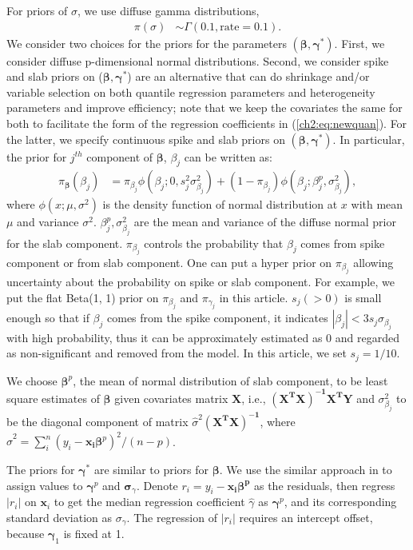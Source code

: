 \documentclass[12pt]{article}
\begin{document}
For priors of $\sigma$, we use diffuse gamma distributions,
\begin{align*}
  \pi(\sigma) & \sim \Gamma(0.1, \mbox{rate} = 0.1).
\end{align*}
We consider two choices for the priors for the parameters
$(\bm{\beta}, \bm{\gamma}^{*})$.  First, we consider diffuse p-dimensional
normal distributions.  Second, we consider spike and slab priors on
($\bm \beta, \bm \gamma^{*}$) are an alternative that can do shrinkage
and/or variable selection on both quantile regression parameters and
heterogeneity parameters and improve efficiency; note that we keep the
covariates the same for both to facilitate the form of the regression
coefficients in (\ref{ch2:eq:newquan}).  For the latter, we specify
continuous spike and slab priors \citep{george1993}
on $(\bm \beta, \bm \gamma^{*})$.
In particular, the prior for $j^{th}$ component of $\bm \beta$, $\beta_j$ can be written as:
\begin{align*}
  \pi_{\bm \beta} (\beta_j) &= \pi_{\beta_j} \phi(\beta_j; 0, s_j^2 \sigma_{\beta_j}^2) + (1- \pi_{\beta_j}) \phi(\beta_j; \beta_j^p, \sigma_{\beta_j}^2),
\end{align*}
where $\phi(x; \mu, \sigma^2)$ is the density function of normal distribution at $x$ with mean $\mu$ and variance $\sigma^2$.
$\beta_j^p, \sigma_{\beta_j}^2$ are the mean and variance of the diffuse normal prior for the slab component.
$\pi_{\beta_j}$ controls the probability that $\beta_j$ comes from spike component or from slab component.
One can put a hyper prior on $\pi_{\beta_j}$ allowing uncertainty about the probability on spike or slab component.
For example, we put the flat Beta(1, 1) prior on  $\pi_{\beta_j}$ and $\pi_{\gamma_j}$ in this article.
$s_j (>0)$ is small enough so that if $\beta_j$ comes from the spike component, it indicates $|\beta_j | < 3 s_j\sigma_{\beta_j}$ with high probability,
thus it can be approximately estimated as 0 and regarded as non-significant and removed from the model.
In this article, we set $s_j = 1/10$.

We choose $\bm \beta^p$, the mean of normal distribution of slab component,
to be least square estimates of $\bm \beta$ given covariates matrix $\bm X$,
i.e., $\bm{(X^TX)^{-1}X^TY}$ and $\sigma_{\beta_j}^2$ to be the diagonal component of matrix $\hat{\sigma}^2 \bm{(X^TX)^{-1}}$,
where $\hat{\sigma}^2 = \sum_i^n (y_i - \bm{x_i\beta}^p)^2/(n - p)$.

The priors for $\bm \gamma^{*}$ are similar to priors for $\bm \beta$.
We use the similar approach in \citet{he1998} to assign values to $\bm \gamma^p$ and $\bm \sigma_{\gamma}$.
Denote $r_i = y_i - \bm{x_i\beta^p}$ as the residuals, then regress $|r_i|$ on $\bm x_i$ to get the median regression coefficient $\hat{\gamma}$ as $\bm \gamma^p$, and its corresponding standard deviation as $\sigma_{\gamma}$.
The regression of $|r_i|$ requires an intercept offset, because $\bm \gamma_1$ is fixed at 1.
\end{document}
